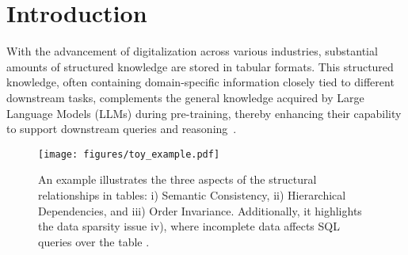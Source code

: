\section{Introduction}
With the advancement of digitalization across various industries, substantial amounts of structured knowledge are stored in tabular formats. This structured knowledge, often containing domain-specific information closely tied to different downstream tasks, complements the general knowledge acquired by Large Language Models (LLMs) during pre-training, thereby enhancing their capability to support downstream queries and reasoning~\cite{cui2024tabular,tan2024struct}.

\begin{figure}[t!]
    \centering
    \texttt{[image: figures/toy\_example.pdf]}
    \caption{An example illustrates the three aspects of the structural relationships in tables: i) Semantic Consistency, ii) Hierarchical Dependencies, and iii) Order Invariance. Additionally, it highlights the data sparsity issue iv), where incomplete data affects SQL queries over the table .}%
    \label{fig:toy_example}
\end{figure}

